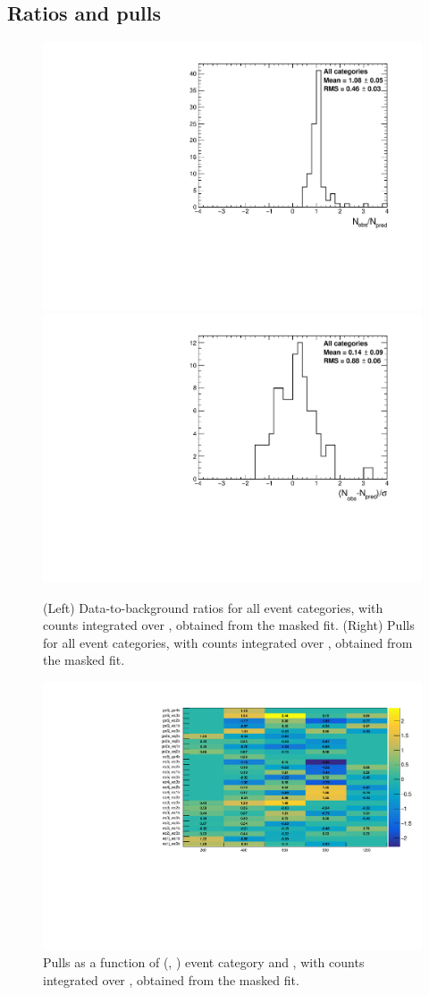 \clearpage
\subsection{Ratios and pulls}

\begin{figure}[h!]
  \centering
  \caption{(Left) Data-to-background ratios for all event categories,
    with counts integrated over \mht, obtained from the masked
    fit. (Right) Pulls for all event categories, with counts
    integrated over \mht, obtained from the masked fit.}
  \label{fig:ratios_and_pulls}
  \includegraphics[width=0.49\linewidth]{figures/results/36invfb/all/ratios_all_prefit.pdf}
  \includegraphics[width=0.49\linewidth]{figures/results/36invfb/all/pulls_all_prefit.pdf}
\end{figure}

\begin{figure}[h!]
  \centering
  \caption{Pulls as a function of (\njet, \nb) event category and
    \scalht [GeV], with counts integrated over \mht, obtained from the
    masked fit.}
  \label{fig:pulls}
  \includegraphics[width=0.8\linewidth]{figures/results/36invfb/all/pull2D_CROnlyFit.pdf}
\end{figure}

